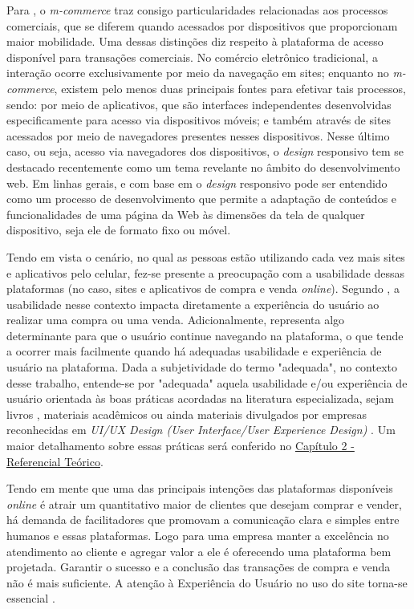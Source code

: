 Para , o \textit{m-commerce} traz consigo particularidades relacionadas aos processos comerciais, que se diferem quando acessados por dispositivos que proporcionam maior mobilidade. Uma dessas distinções diz respeito à plataforma de acesso disponível para transações comerciais. No comércio eletrônico tradicional, a interação ocorre exclusivamente por meio da navegação em sites; enquanto no \textit{m-commerce}, existem pelo menos duas principais fontes para efetivar tais processos, sendo: por meio de aplicativos, que são interfaces independentes desenvolvidas especificamente para acesso via dispositivos móveis; e também através de sites acessados por meio de navegadores presentes nesses dispositivos. Nesse último caso, ou seja, acesso via navegadores dos dispositivos, o \textit{design} responsivo tem se destacado recentemente como um tema revelante no âmbito do desenvolvimento web. Em linhas gerais, e com base em  o \textit{design} responsivo pode ser entendido como um processo de desenvolvimento que permite a adaptação de conteúdos e funcionalidades de uma página da Web às dimensões da tela de qualquer dispositivo, seja ele de formato fixo ou móvel.

Tendo em vista o cenário, no qual as pessoas estão utilizando cada vez mais sites e aplicativos pelo celular, fez-se presente a preocupação com a usabilidade dessas plataformas (no caso, sites e aplicativos de compra e venda \textit{online}). Segundo , a usabilidade nesse contexto impacta diretamente a experiência do usuário ao realizar uma compra ou uma venda. Adicionalmente, representa algo determinante para que o usuário continue navegando na plataforma, o que tende a ocorrer mais facilmente quando há adequadas usabilidade e experiência de usuário na plataforma. Dada a subjetividade do termo "adequada", no contexto desse trabalho, entende-se por "adequada" aquela usabilidade e/ou experiência de usuário orientada às boas práticas acordadas na literatura especializada, sejam livros \cite{AtomicDesignFrost}, materiais acadêmicos \cite{HeuristicasNielsen} ou ainda materiais divulgados por empresas reconhecidas em \textit{UI/UX Design (User Interface/User Experience Design)} \cite{MaterialDesign3}. Um maior detalhamento sobre essas práticas será conferido no \hyperref[chap:refteo]{Capítulo 2 - Referencial Teórico}.

Tendo em mente que uma das principais intenções das plataformas disponíveis \textit{online} é atrair um quantitativo maior de clientes que desejam comprar e vender, há demanda de facilitadores que promovam a comunicação clara e simples entre humanos e essas plataformas. Logo para uma empresa manter a excelência no atendimento ao cliente e agregar valor a ele é oferecendo uma plataforma bem projetada. Garantir o sucesso e a conclusão das transações de compra e venda não é mais suficiente. A atenção à Experiência do Usuário no uso do site torna-se essencial \cite{SudianaChandra}.

